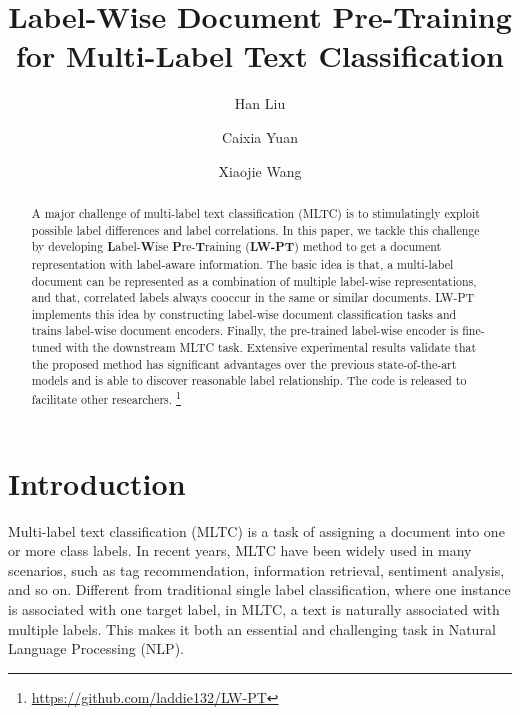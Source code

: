 \documentclass[runningheads]{llncs}
\begin{document}
\title{Label-Wise Document Pre-Training for Multi-Label Text Classification}

\author{Han Liu \and
Caixia Yuan \and
Xiaojie Wang}



\maketitle              \begin{abstract}
A major challenge of multi-label text classification (MLTC) is to stimulatingly exploit possible label differences and label correlations. In this paper, we tackle this challenge by developing \textbf{L}abel-\textbf{W}ise \textbf{P}re-\textbf{T}raining (\textbf{LW-PT}) method to get a document representation with label-aware information. The basic idea is that, a multi-label document can be represented as a combination of multiple label-wise representations, and that, correlated labels always cooccur in the same or similar documents. LW-PT implements this idea by constructing label-wise document classification tasks and trains label-wise document encoders. Finally, the pre-trained label-wise encoder is fine-tuned with the downstream MLTC task. Extensive experimental results validate that the proposed method has significant advantages over the previous state-of-the-art models and is able to discover reasonable label relationship. The code is released to facilitate other researchers.
\footnote{\url{https://github.com/laddie132/LW-PT}}

\end{abstract}

\section{Introduction}
Multi-label text classification (MLTC) is a task of assigning a document into one or more class labels. In recent years, MLTC have been widely used in many scenarios, such as tag recommendation\cite{furnkranz2008multilabel}, information retrieval\cite{gopal2010multilabel}, sentiment analysis\cite{cambria2014senticnet}, and so on. Different from traditional single label classification, where one instance is associated with one target label, in MLTC, a text is naturally associated with multiple labels. This makes it both an essential and challenging task in Natural Language Processing (NLP).
\end{document}
